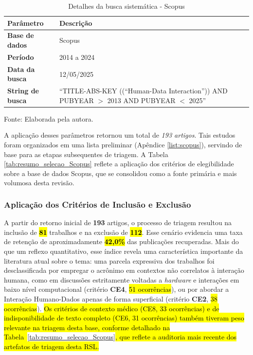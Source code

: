 \documentclass[
	12pt,				%
	oneside,			%
	a4paper,			%
	english,			%
	brazil				%
	]{abntex2ppgsi}
\begin{document}
\begin{table}[htbp]
\centering
\caption{Detalhes da busca sistemática - Scopus}
\label{tab:detalhes_busca}
\renewcommand{\arraystretch}{1.4} 
\begin{tabular}{@{} >{\bfseries}p{3.5cm} p{11cm} @{}}
\toprule
Parâmetro & Descrição \\
\midrule
Base de dados & Scopus \\
Período & 2014 a 2024 \\
Data da busca & 12/05/2025 \\
String de busca & ``TITLE-ABS-KEY ((``Human-Data Interaction'')) AND PUBYEAR $>$ 2013 AND PUBYEAR $<$ 2025'' \\
\bottomrule
\end{tabular}

\vspace{0.2cm} %
{\small Fonte: Elaborada pela autora.}
\end{table}

    A aplicação desses parâmetros retornou um total de \emph{193 artigos}. Tais estudos foram organizados em uma lista preliminar (Apêndice \ref{list:scopus}), servindo de base para as etapas subsequentes de triagem. A Tabela \ref{tab:resumo_selecao_Scopus} reflete a aplicação dos critérios de elegibilidade sobre a base de dados Scopus, que se consolidou como a fonte primária e mais volumosa desta revisão.

\subsubsection{Aplicação dos Critérios de Inclusão e Exclusão}

    A partir do retorno inicial de \textbf{193} artigos, o processo de triagem resultou na inclusão de \hl{\textbf{81}} trabalhos e na exclusão de \hl{\textbf{112}}. Esse cenário evidencia uma taxa de retenção de aproximadamente \hl{\textbf{42,0\%}} das publicações recuperadas. Mais do que um reflexo quantitativo, esse índice revela uma característica importante da literatura atual sobre o tema: uma parcela expressiva dos trabalhos foi desclassificada por empregar o acrônimo em contextos não correlatos à interação humana, como em discussões estritamente voltadas a \textit{hardware} e interações em baixo nível computacional (critério \textbf{CE4}, \hl{51 ocorrências}), ou por abordar a Interação Humano-Dados apenas de forma superficial (critério \textbf{CE2}, \hl{38 ocorrências}). \hl{Os critérios de contexto médico (CE8, 33 ocorrências) e de indisponibilidade de texto completo (CE6, 31 ocorrências) também tiveram peso relevante na triagem desta base, conforme detalhado na Tabela~}\ref{tab:resumo_selecao_Scopus}\hl{, que reflete a auditoria mais recente dos artefatos de triagem desta RSL.}
\end{document}
